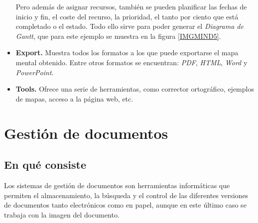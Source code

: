 \documentclass[11pt,a4paper,spanish,twoside]{report}
\begin{document}
\begin{itemize}

            Pero además de asignar recursos, también se pueden
            planificar las fechas de inicio y fin, el coste del recurso, la
            prioridad, el tanto por ciento que está completado o el
            estado. Todo ello sirve para poder generar el \emph{Diagrama de
              Gantt}, que para este ejemplo se muestra en la figura
            \ref{IMGMIND5}.


          \item \textbf{Export.} Muestra todos los formatos a los que puede
            exportarse el mapa mental obtenido. Entre otros formatos se
            encuentran: \emph{PDF}, \emph{HTML}, \emph{Word} y
            \emph{PowerPoint}.

          \item \textbf{Tools.} Ofrece una serie de herramientas, como
            corrector ortográfico, ejemplos de mapas, acceso a la página web,
            etc.

        \end{itemize}

\chapter{Gestión de documentos}
\section{En qué consiste}

Los sistemas de gestión de documentos son herramientas informáticas que
permiten el almacenamiento, la búsqueda y el control de las diferentes
versiones de documentos tanto electrónicos como en papel, aunque en este
último caso se trabaja con la imagen del documento. 
\end{document}

